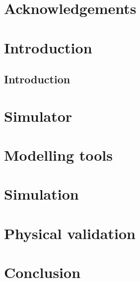 \documentclass[12pt,a4paper, twoside]{report}
\begin{document}




\chapter*{Acknowledgements}


\tableofcontents

\listoffigures

\chapter{Introduction}
\section{Introduction}


\chapter{Simulator}


\chapter{Modelling tools}


\chapter{Simulation}


\chapter{Physical validation}


\chapter{Conclusion}


 
\end{document}
